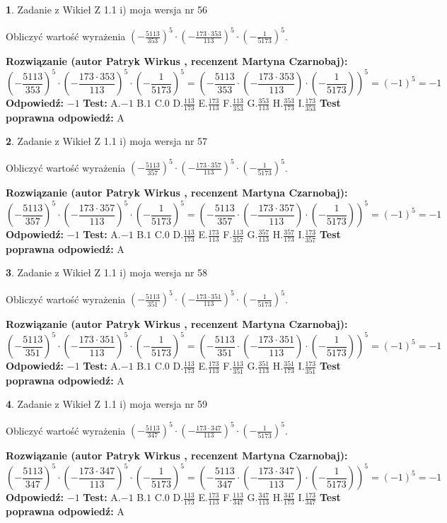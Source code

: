 \documentclass[12pt, a4paper]{article}
\theoremstyle{definition} %
\newtheorem{zad}{}
\newcommand{\zadStart}[1]{\begin{zad}#1\newline}
\newcommand{\zadStop}{\end{zad}}
\newcommand{\rozwStart}[2]{\noindent \textbf{Rozwiązanie (autor #1 , recenzent #2): }\newline}
\newcommand{\rozwStop}{\newline}
\newcommand{\odpStart}{\noindent \textbf{Odpowiedź:}\newline}
\newcommand{\odpStop}{\newline}
\newcommand{\testStart}{\noindent \textbf{Test:}\newline}
\newcommand{\testStop}{\newline}
\newcommand{\kluczStart}{\noindent \textbf{Test poprawna odpowiedź:}\newline}
\newcommand{\kluczStop}{\newline}
\begin{document}
\zadStart{Zadanie z Wikieł Z 1.1 i) moja wersja nr 56}

Obliczyć wartość wyrażenia $(-\frac{5113}{353})^{5} \cdot (-\frac{173 \cdot 353}{113})^{5} \cdot (-\frac{1}{5173})^{5}$.
\zadStop
\rozwStart{Patryk Wirkus}{Martyna Czarnobaj}
$$(-\frac{5113}{353})^{5} \cdot (-\frac{173 \cdot 353}{113})^{5} \cdot (-\frac{1}{5173})^{5} = (-\frac{5113}{353} \cdot (-\frac{173 \cdot 353}{113}) \cdot (-\frac{1}{5173}))^{5} = (-1)^{5} = -1$$
\rozwStop
\odpStart
$-1$
\odpStop
\testStart
A.$-1$ B.$1$ C.$0$ D.$\frac{113}{173}$ E.$\frac{173}{113}$
F.$\frac{113}{353}$ G.$\frac{353}{113}$
H.$\frac{353}{173}$
I.$\frac{173}{353}$
\testStop
\kluczStart
A
\kluczStop



\zadStart{Zadanie z Wikieł Z 1.1 i) moja wersja nr 57}

Obliczyć wartość wyrażenia $(-\frac{5113}{357})^{5} \cdot (-\frac{173 \cdot 357}{113})^{5} \cdot (-\frac{1}{5173})^{5}$.
\zadStop
\rozwStart{Patryk Wirkus}{Martyna Czarnobaj}
$$(-\frac{5113}{357})^{5} \cdot (-\frac{173 \cdot 357}{113})^{5} \cdot (-\frac{1}{5173})^{5} = (-\frac{5113}{357} \cdot (-\frac{173 \cdot 357}{113}) \cdot (-\frac{1}{5173}))^{5} = (-1)^{5} = -1$$
\rozwStop
\odpStart
$-1$
\odpStop
\testStart
A.$-1$ B.$1$ C.$0$ D.$\frac{113}{173}$ E.$\frac{173}{113}$
F.$\frac{113}{357}$ G.$\frac{357}{113}$
H.$\frac{357}{173}$
I.$\frac{173}{357}$
\testStop
\kluczStart
A
\kluczStop



\zadStart{Zadanie z Wikieł Z 1.1 i) moja wersja nr 58}

Obliczyć wartość wyrażenia $(-\frac{5113}{351})^{5} \cdot (-\frac{173 \cdot 351}{113})^{5} \cdot (-\frac{1}{5173})^{5}$.
\zadStop
\rozwStart{Patryk Wirkus}{Martyna Czarnobaj}
$$(-\frac{5113}{351})^{5} \cdot (-\frac{173 \cdot 351}{113})^{5} \cdot (-\frac{1}{5173})^{5} = (-\frac{5113}{351} \cdot (-\frac{173 \cdot 351}{113}) \cdot (-\frac{1}{5173}))^{5} = (-1)^{5} = -1$$
\rozwStop
\odpStart
$-1$
\odpStop
\testStart
A.$-1$ B.$1$ C.$0$ D.$\frac{113}{173}$ E.$\frac{173}{113}$
F.$\frac{113}{351}$ G.$\frac{351}{113}$
H.$\frac{351}{173}$
I.$\frac{173}{351}$
\testStop
\kluczStart
A
\kluczStop



\zadStart{Zadanie z Wikieł Z 1.1 i) moja wersja nr 59}

Obliczyć wartość wyrażenia $(-\frac{5113}{347})^{5} \cdot (-\frac{173 \cdot 347}{113})^{5} \cdot (-\frac{1}{5173})^{5}$.
\zadStop
\rozwStart{Patryk Wirkus}{Martyna Czarnobaj}
$$(-\frac{5113}{347})^{5} \cdot (-\frac{173 \cdot 347}{113})^{5} \cdot (-\frac{1}{5173})^{5} = (-\frac{5113}{347} \cdot (-\frac{173 \cdot 347}{113}) \cdot (-\frac{1}{5173}))^{5} = (-1)^{5} = -1$$
\rozwStop
\odpStart
$-1$
\odpStop
\testStart
A.$-1$ B.$1$ C.$0$ D.$\frac{113}{173}$ E.$\frac{173}{113}$
F.$\frac{113}{347}$ G.$\frac{347}{113}$
H.$\frac{347}{173}$
I.$\frac{173}{347}$
\testStop
\kluczStart
A
\kluczStop
\end{document}
